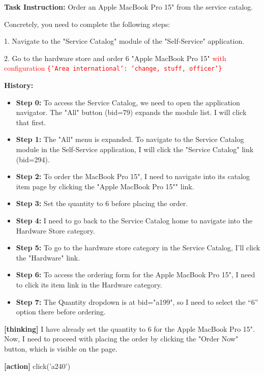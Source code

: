 \begin{incorrectbox}
\textbf{Task Instruction: }Order an Apple MacBook Pro 15" from the service catalog.

Concretely, you need to complete the following steps:

1. Navigate to the "Service Catalog" module of the "Self-Service" application.

2. Go to the hardware store and order 6 "Apple MacBook Pro 15" \textcolor{red}{with configuration \texttt{\{'Area international': 'change, stuff, officer'\}}}

\vspace{4pt}

\textbf{History:}

\begin{itemize}
  \item \textbf{Step 0:} To access the Service Catalog, we need to open the application navigator. The "All" button (bid=79) expands the module list. I will click that first.
  \item \textbf{Step 1:} The "All" menu is expanded. To navigate to the Service Catalog module in the Self-Service application, I will click the "Service Catalog" link (bid=294).
  \item \textbf{Step 2:} To order the MacBook Pro 15", I need to navigate into its catalog item page by clicking the "Apple MacBook Pro 15"" link.
  \item \textbf{Step 3:} Set the quantity to 6 before placing the order.
  \item \textbf{Step 4:} I need to go back to the Service Catalog home to navigate into the Hardware Store category.
  \item \textbf{Step 5:} To go to the hardware store category in the Service Catalog, I'll click the "Hardware" link.
  \item \textbf{Step 6:} To access the ordering form for the Apple MacBook Pro 15", I need to click its item link in the Hardware category.
  \item \textbf{Step 7:} The Quantity dropdown is at bid="a199", so I need to select the “6” option there before ordering.
\end{itemize}

\textbf{[thinking]} I have already set the quantity to 6 for the Apple MacBook Pro 15". Now, I need to proceed with placing the order by clicking the "Order Now" button, which is visible on the page.

\textbf{[action]} click('a240')
\end{incorrectbox}

